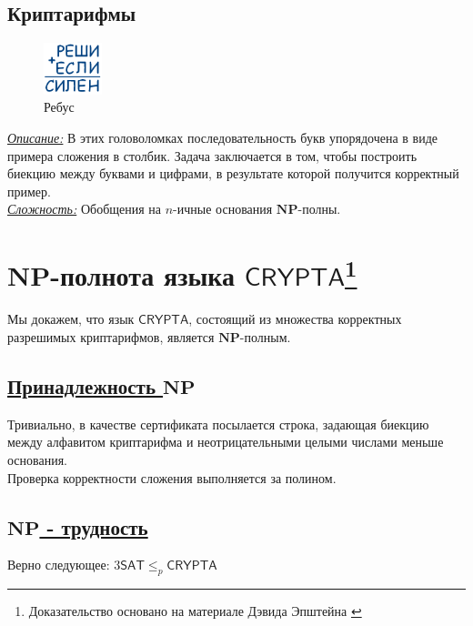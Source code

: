 \documentclass{article}
\begin{document}

\subsection*{Криптарифмы}

\begin{figure}
    \centering
    \includegraphics[width=0.15\textwidth]{cryptarithm.png}
    \caption{Ребус}
\end{figure}

\noindent\textit{\underline{Описание:}} В этих головоломках последовательность букв упорядочена в виде примера сложения в столбик. Задача заключается в том, чтобы построить биекцию между буквами и цифрами, в результате которой получится корректный пример. \\

\noindent\textit{\underline{Сложность:}} Обобщения на $n$-ичные основания $\mathbf{NP}$-полны.

\section*{$\mathbf{NP}$-полнота языка $\mathsf{CRYPTA}$\footnote{Доказательство основано на материале Дэвида Эпштейна \cite{cryptarithms}}}

Мы докажем, что язык $\mathsf{CRYPTA}$, состоящий из множества корректных разрешимых криптарифмов, является $\mathbf{NP}$-полным. \\

\subsection*{\underline{Принадлежность $\mathbf{NP}$}}
Тривиально, в качестве сертификата посылается строка, задающая биекцию между алфавитом криптарифма и неотрицательными целыми числами меньше основания.  \\
Проверка корректности сложения выполняется за полином.

\subsection*{\underline{$\mathbf{NP}$ - трудность}}
Верно следующее: $3\mathsf{SAT} \leq_p \mathsf{CRYPTA}$ \\
\end{document}
